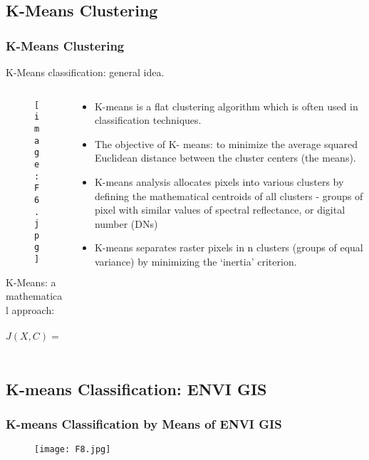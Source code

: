 \documentclass[pdflatex,compress,8pt,
	xcolor={dvipsnames,dvipsnames,svgnames,x11names,table},
	hyperref={	
	breaklinks = true, 
	pdfauthor={Lemenkova Polina}, 
	pdfsubject={Preentation}, 
	pdfcreator={Lemenkova Polina}, 
	pdfproducer={Lemenkova Polina}, 
	colorlinks=true,
	linkcolor=Gold1, 
	citecolor=NavyBlue, 
	urlcolor = NavyBlue, 
	breaklinks = true}]{beamer}
\begin{document}
\subsection{K-Means Clustering}
\begin{frame}\frametitle{K-Means Clustering}
 K-Means classification: general idea.
\begin{minipage}[0.4\textheight]{\textwidth}
\begin{columns}[T]
\begin{column}{0.5\textwidth}
 \begin{figure}[H]
	\centering
		\texttt{[image: F6.jpg]}
\end{figure}
K-Means: a mathematical approach:\\\vspace{1em}

$J(X,C)=\sum_{i=0}^n\frac{min}{\mu_{j}\in C} (||x_j-\mu_i||^{2})$

\end{column}
\begin{column}{0.5\textwidth}
\begin{itemize}
	\item  K-means is a flat clustering algorithm which is often used in classification techniques. \pause
	\item The objective of K- means: to minimize the average squared Euclidean distance between the cluster centers (the means). \pause
	\item K-means analysis allocates pixels into various clusters by defining the mathematical centroids of all clusters - groups of pixel with similar values of spectral reflectance, or digital number (DNs) \pause
	\item K-means separates raster pixels in n clusters (groups of equal variance) by minimizing the ‘inertia’ criterion.
\end{itemize}
\end{column}
\end{columns}
\end{minipage}
\end{frame}

\subsection{K-means Classification: ENVI GIS}
\begin{frame}\frametitle{K-means Classification by Means of ENVI GIS}
\begin{figure}[H]
	\centering
		\texttt{[image: F8.jpg]}
\end{figure}
\end{frame}
\end{document}
